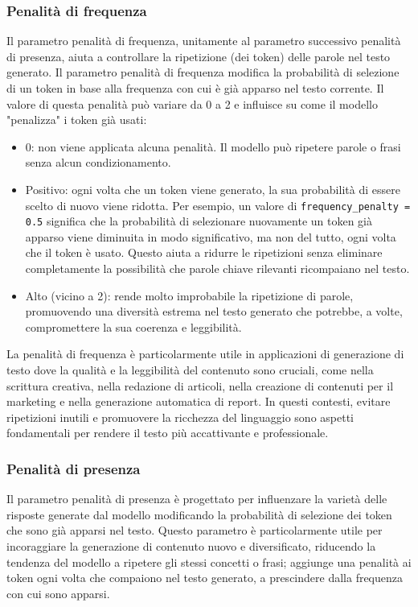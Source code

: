         \subsubsection{Penalità di frequenza}
            Il parametro penalità di frequenza, unitamente al parametro successivo penalità di presenza, aiuta a controllare la ripetizione (dei token) delle parole nel testo generato. Il parametro penalità di frequenza modifica la probabilità di selezione di un token in base alla frequenza con cui è già apparso nel testo corrente.  Il valore di questa penalità può variare da 0 a 2 e influisce su come il modello "penalizza" i token già usati: 
            \begin{itemize}
                \item 0: non viene applicata alcuna penalità. Il modello può ripetere parole o frasi senza alcun condizionamento. 
            
                \item Positivo: ogni volta che un token viene generato, la sua probabilità di essere scelto di nuovo viene ridotta. Per esempio, un valore di \texttt{frequency\_penalty = 0.5} significa che la probabilità di selezionare nuovamente un token già apparso viene diminuita in modo significativo, ma non del tutto, ogni volta che il token è usato. Questo aiuta a ridurre le ripetizioni senza eliminare completamente la possibilità che parole chiave rilevanti ricompaiano nel testo. 
            
                \item Alto (vicino a 2): rende molto improbabile la ripetizione di parole, promuovendo una diversità estrema nel testo generato che potrebbe, a volte, compromettere la sua coerenza e leggibilità. 
            \end{itemize}
            
            La penalità di frequenza è particolarmente utile in applicazioni di generazione di testo dove la qualità e la leggibilità del contenuto sono cruciali, come nella scrittura creativa, nella redazione di articoli, nella creazione di contenuti per il marketing e nella generazione automatica di report. In questi contesti, evitare ripetizioni inutili e promuovere la ricchezza del linguaggio sono aspetti fondamentali per rendere il testo più accattivante e professionale. 
            
        \subsubsection{Penalità di presenza}
            Il parametro penalità di presenza è progettato per influenzare la varietà delle risposte generate dal modello modificando la probabilità di selezione dei token che sono già apparsi nel testo. Questo parametro è particolarmente utile per incoraggiare la generazione di contenuto nuovo e diversificato, riducendo la tendenza del modello a ripetere gli stessi concetti o frasi; aggiunge una penalità ai token ogni volta che compaiono nel testo generato, a prescindere dalla frequenza con cui sono apparsi.  

